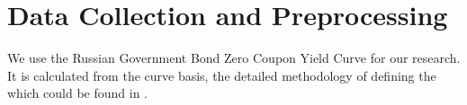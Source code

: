 \section{Data Collection and Preprocessing}
We use the Russian Government Bond Zero Coupon Yield Curve for our research. It is calculated from the curve basis, the detailed methodology of defining the which could be found in \cite{MOEXGCURVEdocs}. 